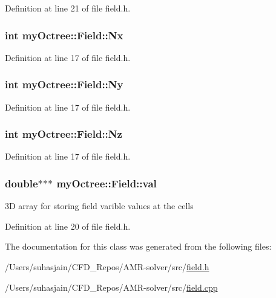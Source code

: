 Definition at line 21 of file field.\+h.

\hypertarget{classmy_octree_1_1_field_ae7d086291559c6c6810752e27641e95b}{}
\subsubsection[{Nx}]{\setlength{\rightskip}{0pt plus 5cm}int my\+Octree\+::\+Field\+::\+Nx}\label{classmy_octree_1_1_field_ae7d086291559c6c6810752e27641e95b}


Definition at line 17 of file field.\+h.

\hypertarget{classmy_octree_1_1_field_a0f1efff9530dcbe0783cacb8ba72e14c}{}
\subsubsection[{Ny}]{\setlength{\rightskip}{0pt plus 5cm}int my\+Octree\+::\+Field\+::\+Ny}\label{classmy_octree_1_1_field_a0f1efff9530dcbe0783cacb8ba72e14c}


Definition at line 17 of file field.\+h.

\hypertarget{classmy_octree_1_1_field_af7697d9e2864fc45a3a9b2b71cd26c7f}{}
\subsubsection[{Nz}]{\setlength{\rightskip}{0pt plus 5cm}int my\+Octree\+::\+Field\+::\+Nz}\label{classmy_octree_1_1_field_af7697d9e2864fc45a3a9b2b71cd26c7f}


Definition at line 17 of file field.\+h.

\hypertarget{classmy_octree_1_1_field_a500198aed026e6892c98b3db47c78348}{}
\subsubsection[{val}]{\setlength{\rightskip}{0pt plus 5cm}double$\ast$$\ast$$\ast$ my\+Octree\+::\+Field\+::val}\label{classmy_octree_1_1_field_a500198aed026e6892c98b3db47c78348}
3\+D array for storing field varible values at the cells 

Definition at line 20 of file field.\+h.



The documentation for this class was generated from the following files\+:\begin{DoxyCompactItemize}
\item 
/\+Users/suhasjain/\+C\+F\+D\+\_\+\+Repos/\+A\+M\+R-\/solver/src/\hyperlink{field_8h}{field.\+h}\item 
/\+Users/suhasjain/\+C\+F\+D\+\_\+\+Repos/\+A\+M\+R-\/solver/src/\hyperlink{field_8cpp}{field.\+cpp}\end{DoxyCompactItemize}
